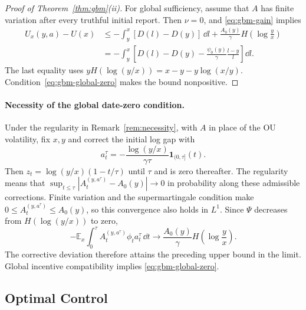 \documentclass[12pt]{article}
\newcommand{\E}{\mathbb{E}}
\begin{document}
\begin{proof}[Proof of Theorem~\ref{thm:gbm}(ii)]
For global sufficiency, assume that \(A\) has finite variation
after every truthful initial report. Then \(\nu=0\), and
\eqref{eq:gbm-gain} implies
\begin{align*}
  U_x(y,a)-U(x)
  &\leq-\int_y^x[D(l)-D(y)]\,\dd l
       +\frac{A_0(y)}\gamma H\!\left(\log\frac yx\right)\\
  &=-\int_y^x\left[
      D(l)-D(y)-\frac{\psi_0(y)}\gamma\frac{l-y}{l}
    \right]\dd l.
\end{align*}
The last equality uses
\(yH(\log(y/x))=x-y-y\log(x/y)\).
Condition~\eqref{eq:gbm-global-zero} makes the bound nonpositive.
\end{proof}

\paragraph{Necessity of the global date-zero condition.}
Under the regularity in Remark~\ref{rem:necessity}, with \(A\)
in place of the OU volatility, fix \(x,y\) and correct the initial
log gap with
\[
  a_t^\tau=-\frac{\log(y/x)}{\gamma\tau}
                    \mathbf1_{(0,\tau]}(t).
\]
Then \(z_t=\log(y/x)(1-t/\tau)\) until \(\tau\) and is zero
thereafter. The regularity means that
\(\sup_{t\leq\tau}|A_t^{(y,a^\tau)}-A_0(y)|\to0\) in probability
along these admissible corrections. Finite variation and the
supermartingale condition make \(0\leq A_t^{(y,a^\tau)}\leq A_0(y)\),
so this convergence also holds in \(L^1\). Since \(\Psi\) decreases
from \(H(\log(y/x))\) to zero,
\[
  -\E_x\int_0^\tau A_t^{(y,a^\tau)}\phi_ta_t^\tau\,\dd t
  \longrightarrow\frac{A_0(y)}\gamma H\!\left(\log\frac yx\right).
\]
The corrective deviation therefore attains the preceding upper bound
in the limit. Global incentive compatibility implies
\eqref{eq:gbm-global-zero}.

\subsection{Optimal Control}
\label{app:gbm-control}
\end{document}
